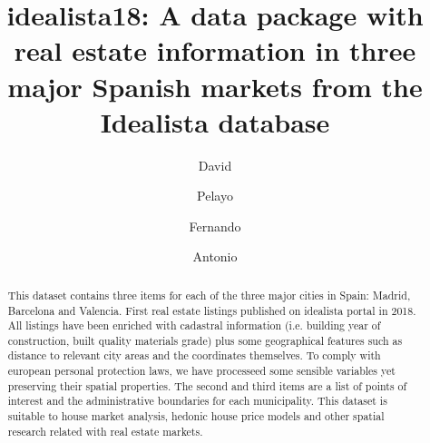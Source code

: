 \documentclass[times,final]{elsarticle}
\begin{document}

\begin{frontmatter}

\title{idealista18: A data package with real estate information in three major Spanish markets from the Idealista database}%

\author[1]{David }
\author[1]{Pelayo }
\author[2]{Fernando }
\author[3]{Antonio }

\address[1]{idealista, Plaza de las Cortes 5, 28014 Madrid, Spain}
\address[2]{Facultad de CC de la Empresa, C/ Real, 3. 30201 Cartagena, Murcia (Spain)}
\address[3]{School of Earth, Environment and Society, McMaster University, 1280 Main St W, Hamilton, Ontario L8S 4K1 Canada}



\begin{abstract}
This dataset contains three items for each of the three major cities in Spain: Madrid, Barcelona and Valencia. First real estate listings published on idealista portal in 2018. All listings have been enriched with cadastral information (i.e. building year of construction, built quality materials grade) plus some geographical features such as
distance to relevant city areas and the coordinates themselves. To comply with european personal protection laws, we have processeed some sensible variables yet preserving their spatial properties. The second and third items are a list of points of interest and the administrative boundaries for each municipality.
This dataset is suitable to house market analysis, hedonic house price models and other spatial research related with real estate markets.


\end{abstract}
\end{frontmatter}
\end{document}
